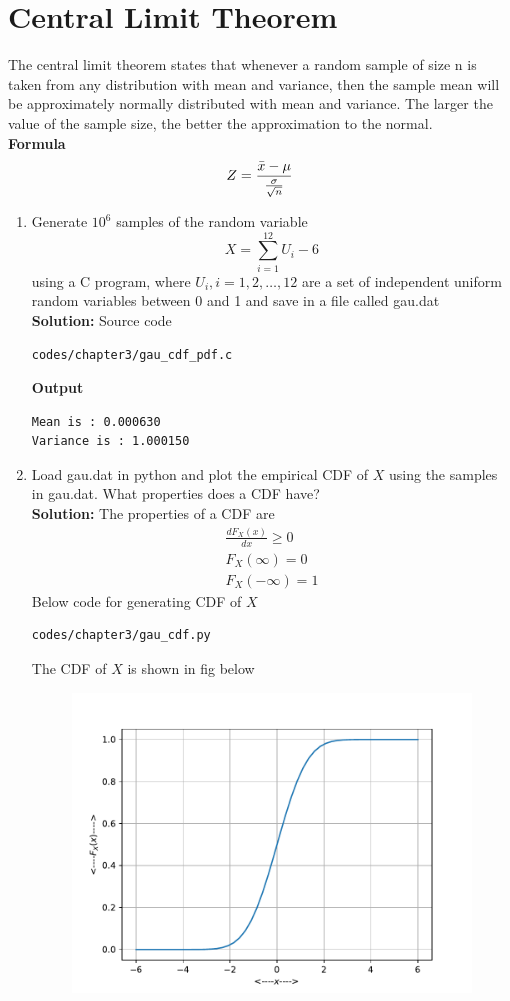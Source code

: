 \documentclass[journal,15pt,twocolumn]{IEEEtran}
\newcommand{\solution}{\noindent \textbf{Solution: }}
\begin{document}
\section{\textbf{Central Limit Theorem}}
The central limit theorem states that whenever a random sample of size n is taken from any distribution with mean and variance, then the sample mean will be approximately normally distributed with mean and variance. The larger the value of the sample size, the better the approximation to the normal.\\
\textbf{Formula}
\begin{align}
    Z = \frac{ \Bar{x} -\mu}{\frac{\sigma}{\sqrt{n}}} 
\end{align}
\begin{enumerate}
%
%
\item
Generate $10^6$ samples of the random variable
%
\begin{equation}
X = \sum_{i=1}^{12}U_i -6
\end{equation}
%
using a C program, where $U_i, i = 1,2,\dots, 12$ are  a set of independent uniform random variables between 0 and 1
and save in a file called gau.dat\\
\solution Source code
\begin{lstlisting}
codes/chapter3/gau_cdf_pdf.c
\end{lstlisting}
\textbf{Output}
\begin{lstlisting}
Mean is : 0.000630
Variance is : 1.000150
\end{lstlisting}
%
\item
Load gau.dat in python and plot the empirical CDF of $X$ using the samples in gau.dat. What properties does a CDF have?
\\
\solution 
The properties of a CDF are 
\begin{eqnarray}
       \frac{dF_X(x)}{dx} \ge 0 \\
        F_X(\infty) = 0\\
	F_X(-\infty) = 1
\end{eqnarray}
Below code for generating CDF of $X$
\begin{lstlisting}
codes/chapter3/gau_cdf.py
\end{lstlisting}
The CDF of $X$ is shown in fig below
\begin{figure}[H]
\centering
\includegraphics[width=\columnwidth]{./figs/chapter3/gau_cdf.pdf}

\end{figure}
\end{enumerate}
\end{document}
